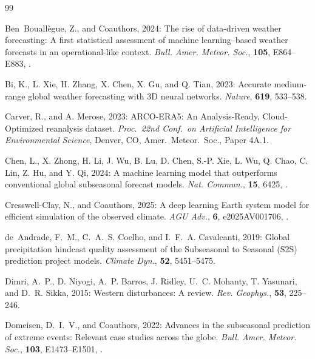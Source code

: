 \begin{thebibliography}{99}

Ben~Bouall\`egue, Z., and Coauthors, 2024: The rise of data-driven
weather forecasting: A first statistical assessment of machine
learning--based weather forecasts in an operational-like context.
\textit{Bull. Amer. Meteor. Soc.}, \textbf{105}, E864--E883,
.

Bi, K., L. Xie, H. Zhang, X. Chen, X. Gu, and Q. Tian, 2023: Accurate
medium-range global weather forecasting with 3D neural networks.
\textit{Nature}, \textbf{619}, 533--538.

Carver, R., and A. Merose, 2023: ARCO-ERA5: An Analysis-Ready,
Cloud-Optimized reanalysis dataset. \textit{Proc.\ 22nd Conf.\ on
Artificial Intelligence for Environmental Science}, Denver, CO,
Amer.\ Meteor.\ Soc., Paper 4A.1.

Chen, L., X. Zhong, H. Li, J. Wu, B. Lu, D. Chen, S.-P. Xie, L. Wu,
Q. Chao, C. Lin, Z. Hu, and Y. Qi, 2024: A machine learning model
that outperforms conventional global subseasonal forecast models.
\textit{Nat. Commun.}, \textbf{15}, 6425,
.

Cresswell-Clay, N., and Coauthors, 2025: A deep learning Earth system
model for efficient simulation of the observed climate.
\textit{AGU Adv.}, \textbf{6}, e2025AV001706,
.

de~Andrade, F.~M., C.~A.~S. Coelho, and I.~F.~A. Cavalcanti, 2019:
Global precipitation hindcast quality assessment of the Subseasonal
to Seasonal (S2S) prediction project models. \textit{Climate Dyn.},
\textbf{52}, 5451--5475.

Dimri, A.~P., D. Niyogi, A.~P. Barros, J. Ridley, U.~C. Mohanty,
T. Yasunari, and D.~R. Sikka, 2015: Western disturbances: A review.
\textit{Rev. Geophys.}, \textbf{53}, 225--246.

Domeisen, D.~I.~V., and Coauthors, 2022: Advances in the subseasonal
prediction of extreme events: Relevant case studies across the globe.
\textit{Bull. Amer. Meteor. Soc.}, \textbf{103}, E1473--E1501,
.


\end{thebibliography}
